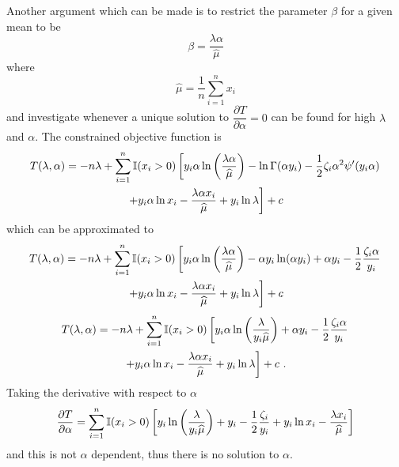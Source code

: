 \documentclass[12pt, a4paper]{memoir}
\begin{document}
Another argument which can be made is to restrict the parameter $\beta$ for a given mean to be
\begin{equation}
\beta = \frac{\lambda\alpha}{\widehat{\mu}}
\label{eq:compoundPoisson:beta_restrict}
\end{equation}
where
\begin{equation}
\widehat{\mu} = \frac{1}{n}\sum_{i=1}^n x_i
\end{equation}
and investigate whenever a unique solution to $\dfrac{\partial T}{\partial \alpha} = 0$ can be found for high $\lambda$ and $\alpha$. The constrained objective function is
\begin{multline*}
T(\lambda,\alpha)
=
-n\lambda+
	\sum_{i=1}^n
	\mathbb{I}(x_i>0)
	\left[
	y_i\alpha\ln\left(\frac{\lambda\alpha}{\widehat{\mu}}\right)-\ln\Gamma(\alpha y_i) - \frac{1}{2}\zeta_i\alpha^2\psi'(y_i\alpha)
	\right.\\\left.
	+y_i\alpha\ln x_i - \frac{\lambda\alpha x_i}{\widehat{\mu}}
	+ y_i \ln \lambda
	\vphantom{\frac{1}{1}}\right] + c
\end{multline*}
which can be approximated to
\begin{multline*}
T(\lambda,\alpha)
=
-n\lambda+
	\sum_{i=1}^n
	\mathbb{I}(x_i>0)
	\left[
	y_i\alpha\ln\left(\frac{\lambda\alpha}{\widehat{\mu}}\right)-\alpha y_i\ln(\alpha y_i) + \alpha y_i - \frac{1}{2}\frac{\zeta_i\alpha}{y_i}
	\right.\\\left.
	+y_i\alpha\ln x_i - \frac{\lambda\alpha x_i}{\widehat{\mu}}
	+ y_i \ln \lambda
	\vphantom{\frac{1}{1}}\right] + c
\end{multline*}
\begin{multline*}
T(\lambda,\alpha)
=
-n\lambda+
	\sum_{i=1}^n
	\mathbb{I}(x_i>0)
	\left[
	y_i\alpha\ln\left(\frac{\lambda}{y_i\widehat{\mu}}\right) + \alpha y_i - \frac{1}{2}\frac{\zeta_i\alpha}{y_i}
	\right.\\\left.
	+y_i\alpha\ln x_i - \frac{\lambda\alpha x_i}{\widehat{\mu}}
	+ y_i \ln \lambda
	\vphantom{\frac{1}{1}}\right] + c \ .
\end{multline*}
Taking the derivative with respect to $\alpha$
\begin{equation*}
\frac{\partial T}{\partial \alpha}
=
	\sum_{i=1}^n
	\mathbb{I}(x_i>0)
	\left[
	y_i\ln\left(\frac{\lambda}{y_i\widehat{\mu}}\right) +  y_i - \frac{1}{2}\frac{\zeta_i}{y_i}
	+y_i\ln x_i - \frac{\lambda x_i}{\widehat{\mu}}
	\vphantom{\frac{1}{1}}\right]
\end{equation*}
and this is not $\alpha$ dependent, thus there is no solution to $\alpha$.
\end{document}
